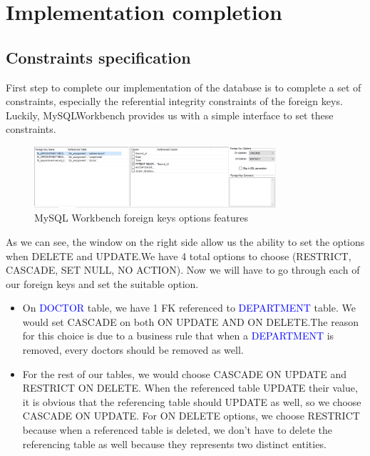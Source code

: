 \section{Implementation completion}

\subsection{Constraints specification}
First step to complete our implementation of the database is to complete a set of constraints, especially the referential integrity constraints of the foreign keys.
Luckily, MySQLWorkbench provides us with a simple interface to set these constraints.

\begin{figure}[H]
  \centering
  \includegraphics[width=0.8\textwidth]{assets/constraints_1.png}
  \captionsetup{justification=centering,margin=2cm}
  \caption{MySQL Workbench foreign keys options features}
\end{figure}

As we can see, the window on the right side allow us the ability to set the options when DELETE and UPDATE.We have 4 total options to choose (RESTRICT, CASCADE, SET NULL, NO ACTION).
Now we will have to go through each of our foreign keys and set the suitable option.

\begin{itemize}
  \item On \textcolor{blue}{DOCTOR} table, we have 1 FK referenced to \textcolor{blue}{DEPARTMENT} table.
        We would set CASCADE on both ON UPDATE AND ON DELETE.The reason for this choice is due to a business rule that when a \textcolor{blue}{DEPARTMENT} is removed, every doctors should be removed as well.
  \item For the rest of our tables, we would choose CASCADE ON UPDATE and RESTRICT ON DELETE\@.
        When the referenced table UPDATE their value, it is obvious that the referencing table should UPDATE as well, so we choose CASCADE ON UPDATE\@.
        For ON DELETE options, we choose RESTRICT because when a referenced table is deleted, we don't have to delete the referencing table as well because they represents two distinct entities.
\end{itemize}

